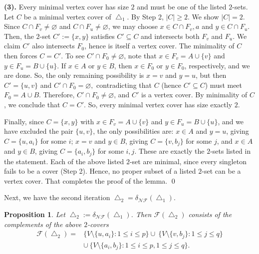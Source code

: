 \documentclass[12pt]{article}
\renewenvironment{proof}{{\noindent\bfseries Proof.}}{\qed}
\theoremstyle{plain}
\newtheorem{proposition}[theorem]{Proposition}
\theoremstyle{definition}
\newcommand{\F}{\mathcal{F}}
\newcommand{\V}{V}
\begin{document}
\begin{proof}
			\medskip\noindent
			\textbf{(3).} Every minimal vertex cover has size \(2\) and must be one of the listed \(2\)-sets.	Let \(C\) be a minimal vertex cover of \(\bigtriangleup_1\).
			By Step 2, \(|C|\ge 2\). We show \(|C|=2\).
			Since \(C\cap F_v\neq\varnothing\) and \(C\cap F_u\neq\varnothing\), we may choose $x\in C\cap F_v, a$ and $ y\in C\cap F_u.$	Then, the \(2\)-set \(C':=\{x,y\}\) satisfies \(C'\subseteq C\) and intersects both \(F_v\) and \(F_u\).
			We claim \(C'\) also intersects \(F_0\), hence is itself a vertex cover. The minimality of \(C\) then forces \(C=C'\).
			 To see \(C'\cap F_0\neq\varnothing\), note that \(x\in F_v=A\cup\{v\}\) and \(y\in F_u=B\cup\{u\}\).
			If \(x\in A\) or \(y\in B\), then \(x\in F_0\) or \(y\in F_0\), respectively, and we are done.
			So, the only remaining possibility is \(x=v\) and \(y=u\), but then $C'=\{u,v\} $ and $C'\cap F_0=\varnothing,$	contradicting that \(C\) (hence \(C'\subseteq C\)) must meet \(F_0=A\cup B\).			Therefore, \(C'\cap F_0\neq\varnothing\), and \(C'\) is a vertex cover. By minimality of \(C\), we conclude that  \(C=C'\). So, every minimal vertex cover has size exactly \(2\).
			
			Finally, since \(C=\{x,y\}\) with \(x\in F_v=A\cup\{v\}\) and \(y\in F_u=B\cup\{u\}\), and we have excluded the pair \(\{u,v\}\),
			the only possibilities are: \(x\in A\) and \(y=u\), giving \(C=\{u,a_i\}\) for some \(i\);  \(x=v\) and \(y\in B\), giving \(C=\{v,b_j\}\) for some \(j\), and   \(x\in A\) and \(y\in B\), giving \(C=\{a_i,b_j\}\) for some \(i,j\). These are exactly the \(2\)-sets listed in the statement. Each of the above listed \(2\)-set are minimal, since every singleton fails to be a cover (Step 2). Hence, no proper subset of a listed \(2\)-set can be a vertex cover. That completes the proof of  the lemma.
		\end{proof}
		
		\medskip
		Next, we have the second iteration \(\bigtriangleup_2=\delta_{\mathcal{NF}}(\bigtriangleup_1)\).
		\begin{proposition}
			Let \(\bigtriangleup_2:=\delta_{\mathcal{NF}}(\bigtriangleup_1)\). Then \(\F(\bigtriangleup_2)\) consists of the complements of the above $2$-covers
			\begin{align*}
			\F(\bigtriangleup_2)=&
			\bigl\{\V\setminus\{u,a_i\}: 1\le i\le p\bigr\}
			 \cup\
			\bigl\{\V\setminus\{v,b_j\}: 1\le j\le q\bigr\}\\
			& \cup\
			\bigl\{\V\setminus\{a_i,b_j\}: 1\le i\le p, 1\le j\le q\bigr\}.
			\end{align*}
		\end{proposition}
		
\end{document}
